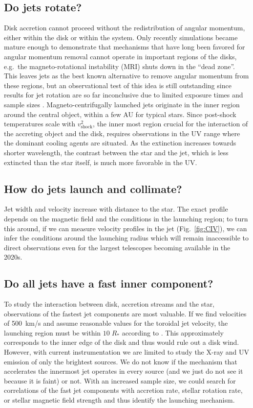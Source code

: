 \documentclass[12pt]{article}
\begin{document}
\subsection{Do jets rotate?}
Disk accretion cannot proceed without the redistribution of angular momentum, either within the disk or within the system. Only recently simulations became mature enough to demonstrate that mechanisms that have long been favored for angular momentum removal cannot operate in important regions of the disks, e.g.\ the magneto-rotational instability (MRI) shuts down in the ``dead zone''. This  leaves jets as the best known alternative to remove angular momentum from these regions, but an observational test of this idea is still outstanding since results for jet rotation are so far inconclusive due to limited exposure times and sample sizes \citep{2007ApJ...663..350C}. Magneto-centrifugally launched jets originate in the inner region around the central object, within a few AU for typical stars. Since post-shock temperatures scale with $v^2_\mathrm{shock}$, the inner most region crucial for the interaction of the accreting object and the disk, requires observations in the UV range where the dominant cooling agents are situated.
As the extinction increases towards shorter wavelength, the contrast between the star and the jet, which is less extincted than the star itself, is much
more favorable in the UV.


\subsection{How do jets launch and collimate?}
Jet width and velocity increase with distance to the star. The exact profile depends on the magnetic field and the conditions in the launching region; to turn this around, if we can measure velocity profiles in the jet (Fig.~\ref{fig:CIV}), we can infer the conditions around the launching radius which will remain inaccessible to direct observations even for the largest telescopes becoming available in the 2020s.


\subsection{Do all jets have a fast inner component?}
To study the interaction between disk, accretion streams and the star, observations of the fastest jet components are most valuable. If we find velocities of 500~km/s and assume
reasonable values for the toroidal jet velocity, the launching region must be
within $10\;R_*$ according to \citet{2003ApJ...590L.107A}. This approximately
corresponds to the inner edge of the disk and thus would rule out a disk
wind. However, with current instrumentation we are limited to study the X-ray
and UV emission of only the brightest sources. We do not know if the mechanism
that accelerates the innermost jet operates in every source (and we just do not
see it because it is faint) or not. With an increased sample size, we could search for correlations of the fast jet components with accretion rate, stellar rotation rate, or stellar magnetic field strength and thus identify the launching mechanism.
\end{document}
